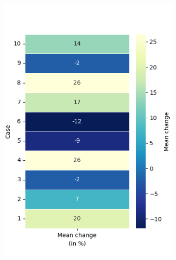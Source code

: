\begin{figure}[h!]
\begin{subfigure}[t]{0.32\textwidth}
		\includegraphics[width=\textwidth]{Figures/DP_mean_heatmap_percentage.png}
		\label{fig: DP_mean}
		\caption{}
	\end{subfigure}
	
	\vspace{0.2cm}
	

\end{figure}
